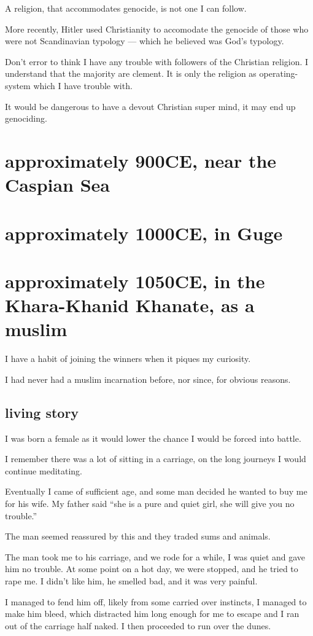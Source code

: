 A religion, that accommodates genocide, is not one I can follow.

More recently, Hitler used Christianity\cite{christianhitler} to accomodate 
the genocide of those who were not Scandinavian typology --- which he believed
was God's typology.

Don't error to think I have any trouble with followers of the Christian
religion. I understand that the majority are clement. It is only the religion as
operating-system which I have trouble with.

It would be dangerous to have a devout Christian super mind,
it may end up genociding.
\chapter{approximately 900CE, near the Caspian Sea}
\chapter{approximately 1000CE, in Guge}
\chapter{approximately 1050CE, in the Khara-Khanid Khanate, as a muslim}
\label{reincarnation:muslim}
I have a habit of joining the winners when it piques my curiosity. 

I had never had a muslim incarnation before, nor since, for obvious reasons.

\section{living story}
I was born a female as it would lower the chance I would be forced into battle. 

I remember there was a lot of sitting in a carriage, on the long journeys I 
would continue meditating. 

Eventually I came of sufficient age, and some man decided he wanted to buy me
for his wife. My father said ``she is a pure and quiet girl, she will give you no
trouble.''

The man seemed reassured by this and they traded sums and animals.

The man took me to his carriage, and we rode for a while, I was quiet and gave
him no trouble. At some point on a hot day, we were stopped, and he tried to 
rape me. I didn't like him, he smelled bad, and it was very painful. 

I managed to fend him off, likely from some carried over instincts, I managed to
make him bleed, which distracted him long enough for me to escape and I ran out 
of the carriage half naked. I then proceeded to run over the dunes. 

